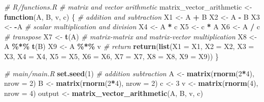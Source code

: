 \documentclass[
]{book}
\newenvironment{Shaded}{\begin{snugshade}}{\end{snugshade}}
\newcommand{\AttributeTok}[1]{\textcolor[rgb]{0.13,0.29,0.53}{#1}}
\newcommand{\CommentTok}[1]{\textcolor[rgb]{0.56,0.35,0.01}{\textit{#1}}}
\newcommand{\ControlFlowTok}[1]{\textcolor[rgb]{0.13,0.29,0.53}{\textbf{#1}}}
\newcommand{\DecValTok}[1]{\textcolor[rgb]{0.00,0.00,0.81}{#1}}
\newcommand{\FunctionTok}[1]{\textcolor[rgb]{0.13,0.29,0.53}{\textbf{#1}}}
\newcommand{\NormalTok}[1]{#1}
\newcommand{\OtherTok}[1]{\textcolor[rgb]{0.56,0.35,0.01}{#1}}
\newcommand{\SpecialCharTok}[1]{\textcolor[rgb]{0.81,0.36,0.00}{\textbf{#1}}}
\begin{document}
\begin{Shaded}
\begin{Highlighting}[]
\CommentTok{\# R/functions.R}
\CommentTok{\# matrix and vector arithmetic}
\NormalTok{matrix\_vector\_arithmetic }\OtherTok{\textless{}{-}}
  \ControlFlowTok{function}\NormalTok{(A, B, v, c) \{}
    \CommentTok{\# addition and subtraction}
\NormalTok{    X1 }\OtherTok{\textless{}{-}}\NormalTok{ A }\SpecialCharTok{+}\NormalTok{ B}
\NormalTok{    X2 }\OtherTok{\textless{}{-}}\NormalTok{ A }\SpecialCharTok{{-}}\NormalTok{ B}
\NormalTok{    X3 }\OtherTok{\textless{}{-}} \SpecialCharTok{{-}}\NormalTok{A}
    \CommentTok{\# scalar multiplication and division}
\NormalTok{    X4 }\OtherTok{\textless{}{-}}\NormalTok{ A }\SpecialCharTok{*}\NormalTok{ c}
\NormalTok{    X5 }\OtherTok{\textless{}{-}}\NormalTok{ c }\SpecialCharTok{*}\NormalTok{ A}
\NormalTok{    X6 }\OtherTok{\textless{}{-}}\NormalTok{ A }\SpecialCharTok{/}\NormalTok{ c}
    \CommentTok{\# transpose}
\NormalTok{    X7 }\OtherTok{\textless{}{-}} \FunctionTok{t}\NormalTok{(A)}
    \CommentTok{\# matrix{-}matrix and matrix{-}vector multiplication}
\NormalTok{    X8 }\OtherTok{\textless{}{-}}\NormalTok{ A }\SpecialCharTok{\%*\%} \FunctionTok{t}\NormalTok{(B)}
\NormalTok{    X9 }\OtherTok{\textless{}{-}}\NormalTok{ A }\SpecialCharTok{\%*\%}\NormalTok{ v}
    \CommentTok{\# return}
    \FunctionTok{return}\NormalTok{(}\FunctionTok{list}\NormalTok{(}\AttributeTok{X1 =}\NormalTok{ X1,}
                \AttributeTok{X2 =}\NormalTok{ X2,}
                \AttributeTok{X3 =}\NormalTok{ X3,}
                \AttributeTok{X4 =}\NormalTok{ X4,}
                \AttributeTok{X5 =}\NormalTok{ X5,}
                \AttributeTok{X6 =}\NormalTok{ X6,}
                \AttributeTok{X7 =}\NormalTok{ X7,}
                \AttributeTok{X8 =}\NormalTok{ X8,}
                \AttributeTok{X9 =}\NormalTok{ X9))}
\NormalTok{  \}}
\end{Highlighting}
\end{Shaded}

\begin{Shaded}
\begin{Highlighting}[]
\CommentTok{\# main/main.R}
\FunctionTok{set.seed}\NormalTok{(}\DecValTok{1}\NormalTok{)}
\CommentTok{\# addition subtraction}
\NormalTok{A }\OtherTok{\textless{}{-}} \FunctionTok{matrix}\NormalTok{(}\FunctionTok{rnorm}\NormalTok{(}\DecValTok{2}\SpecialCharTok{*}\DecValTok{4}\NormalTok{), }\AttributeTok{nrow =} \DecValTok{2}\NormalTok{)}
\NormalTok{B }\OtherTok{\textless{}{-}} \FunctionTok{matrix}\NormalTok{(}\FunctionTok{rnorm}\NormalTok{(}\DecValTok{2}\SpecialCharTok{*}\DecValTok{4}\NormalTok{), }\AttributeTok{nrow =} \DecValTok{2}\NormalTok{)}
\NormalTok{c }\OtherTok{\textless{}{-}} \DecValTok{3}
\NormalTok{v }\OtherTok{\textless{}{-}} \FunctionTok{matrix}\NormalTok{(}\FunctionTok{rnorm}\NormalTok{(}\DecValTok{4}\NormalTok{), }\AttributeTok{nrow =} \DecValTok{4}\NormalTok{)}
\NormalTok{output }\OtherTok{\textless{}{-}} \FunctionTok{matrix\_vector\_arithmetic}\NormalTok{(A, B, v, c)}
\end{Highlighting}
\end{Shaded}
\end{document}
